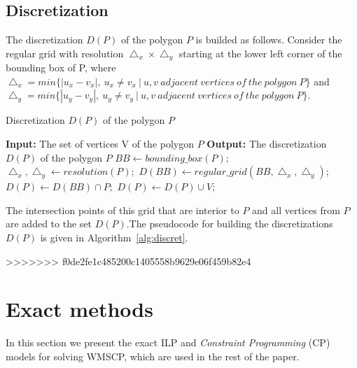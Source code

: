 \documentclass[runningheads,a4paper]{elsarticle}
\begin{document}
	
	\subsection{Discretization}  
	The discretization $D(P)$ of the polygon $P$ is builded as follows. Consider the regular grid with resolution $\bigtriangleup_{x}\times\bigtriangleup_{y}$ starting at the lower left corner of the bounding box of P, where \\
$ \bigtriangleup_{x}=min\{ |u_{x}-v_{x}|,\ u_{x}\neq v_{x}\ |\  u,v\ adjacent\ vertices\ of\ the\ polygon\ P \}$ and\\
$ \bigtriangleup_{y}=min\{ |u_{y}-v_{y}|,\ u_{y}\neq v_{y}\ |\  u,v\ adjacent\ vertices\ of\ the\ polygon\ P \}$.
	
	\begin{algorithm}[!t]
		\caption{Discretization $D(P)$ of the polygon $P$}\label{alg:discret}
		\begin{algorithmic}[1]
			\State \textbf{Input:} The set of vertices V of the polygon $P$
			\State \textbf{Output:} The discretization $D(P)$ of the polygon $P$
			\State $BB \gets bounding\_box(P);$
			\State $\bigtriangleup_{x},\bigtriangleup_{y} \gets resolution(P);$
			\State $D(BB) \gets regular\_grid(BB,\bigtriangleup_{x},\bigtriangleup_{y});$
			\State $D(P) \gets D(BB) \cap P;$
			\State $D(P) \gets D(P) \cup V;$
		\end{algorithmic}
	\end{algorithm}
	
	
	The intersection points of this grid that are interior to $P$ and all vertices from $P$ are added to the set $D(P)$.The pseudocode for building the discretizations $D(P)$ is given in Algorithm~\ref{alg:discret}.
	

>>>>>>> f0de2fe1c485200c1405558b9629e06f459b82e4
	
	\section{Exact methods}
	In this section we present the exact ILP and \emph{Constraint Programming} (CP) models for solving WMSCP, which are used  in the rest of the paper.
\end{document}
